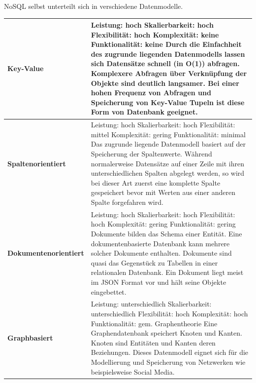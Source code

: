 \newpage
NoSQL selbst unterteilt sich in verschiedene Datenmodelle. \cite{WikiNoSQL}
\begin{longtable}{| p{4cm} | p{11.7cm} |}
\hline
\textbf{Key-Value} & Leistung: hoch \newline Skalierbarkeit: hoch \newline Flexibilität: hoch \newline Komplexität: keine \newline Funktionalität: keine \newline
Durch die Einfachheit des zugrunde liegenden Datenmodells lassen sich Datensätze schnell (in O(1)) abfragen. Komplexere Abfragen über Verknüpfung der Objekte sind deutlich langsamer. Bei einer hohen Frequenz von Abfragen und Speicherung von Key-Value Tupeln ist diese Form von Datenbank geeignet.
\\ \hline
\textbf{Spaltenorientiert} & Leistung: hoch \newline Skalierbarkeit: hoch \newline Flexibilität: mittel \newline Komplexität: gering \newline Funktionalität: minimal \newline
Das zugrunde liegende Datenmodell basiert auf der Speicherung der Spaltenwerte. Während normalerweise Datensätze auf einer Zeile mit ihren unterschiedlichen Spalten abgelegt werden, so wird bei dieser Art zuerst eine komplette Spalte gespeichert bevor mit Werten aus einer anderen Spalte forgefahren wird. 
\\ \hline
\textbf{Dokumentenorientiert} & Leistung: hoch \newline Skalierbarkeit: hoch \newline Flexibilität: hoch \newline Komplexität: gering \newline Funktionalität: gering \newline
Dokumente bilden das Schema einer Entität. Eine dokumentenbasierte Datenbank kann mehrere solcher Dokumente enthalten. Dokumente sind quasi das Gegenstück zu Tabellen in einer relationalen Datenbank. Ein Dokument liegt meist im JSON Format vor und hält seine Objekte eingebettet. 
\\ \hline
\textbf{Graphbasiert} & Leistung: unterschiedlich \newline Skalierbarkeit: unterschiedlich \newline Flexibilität: hoch \newline Komplexität: hoch \newline Funktionalität: gem. Graphentheorie \newline
Eine Graphendatenbank speichert Knoten und Kanten. Knoten sind Entitäten und Kanten deren Beziehungen. Dieses Datenmodell eignet sich für die Modellierung und Speicherung von Netzwerken wie beispielsweise Social Media.
\\ \hline
\end{longtable}
 \newpage

